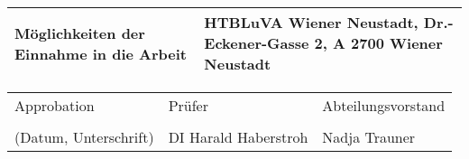 \begin{center}
\vspace{5mm}


\vspace{5mm}

\begin{tabular}{| m{8cm} | m{8cm} |}
    \hline
    Möglichkeiten der Einnahme in die Arbeit & HTBLuVA Wiener Neustadt, Dr.-Eckener-Gasse 2, A 2700 Wiener Neustadt\\
    \hline
\end{tabular}

\vspace{5mm}

\begin{tabular}{| m{5cm} | m{6cm} | m{5cm} |}
    \hline
    Approbation & Prüfer & Abteilungsvorstand\\
    &&\\
    (Datum, Unterschrift) & DI Harald Haberstroh & Nadja Trauner\\ %
    \hline
\end{tabular}

\end{center}


